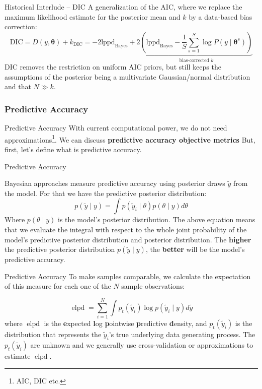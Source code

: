 \begin{frame}{Historical Interlude -- DIC \parencite{spiegelhalter2002bayesian}}
	A generalization of the AIC,
	where we replace the maximum likelihood estimate for the posterior mean
	and $k$ by a data-based bias correction:
	$$
		\text{DIC} = D(y, \boldsymbol{\theta}) + k_{\text{DIC}} = -2 \text{lppd}_{\text{Bayes}}
		+2 \underbrace{\left( \text{lppd}_{\text{Bayes}} - \frac{1}{S} \sum^S_{s=1} \log P(y \mid \boldsymbol{\theta}^s) \right)}_{\text{bias-corrected $k$}}
	$$
	DIC removes the restriction on uniform AIC priors, but still
	keeps the assumptions of the posterior being a multivariate Gaussian/normal distribution
	and that $N \gg k$.
\end{frame}

\subsubsection{Predictive Accuracy}
\begin{frame}{Predictive Accuracy}
	With current computational power, we do not need approximations\footnote{AIC, DIC etc.}.
	\vfill
	We can discuss \textbf{predictive accuracy objective metrics}
	\vfill
	But, first, let's define what is predictive accuracy.
\end{frame}

\begin{frame}{Predictive Accuracy}
	\begin{defn}
		Bayesian approaches measure predictive accuracy using posterior draws
		$\tilde{y}$ from the model.
		For that we have the predictive posterior distribution:
		$$
			p(\tilde{y} \mid y) = \int p(\tilde{y}_i \mid \theta) p(\theta \mid y) d \theta
		$$
		\small
		Where $p(\theta \mid y)$ is the model's posterior distribution.
		The above equation means that we evaluate the integral
		with respect to the whole joint probability of the model's
		predictive posterior distribution and posterior distribution.
		\vfill
		\normalsize
		The \textbf{higher} the predictive posterior distribution
		$p(\tilde{y} \mid y)$,
		the \textbf{better} will be the model's predictive accuracy.
	\end{defn}
\end{frame}

\begin{frame}{Predictive Accuracy}
	To make samples comparable,
	we calculate the expectation of this measure for each one of the $N$ sample observations:

	$$
		\operatorname{elpd} = \sum_{i=1}^N \int p_t(\tilde{y}_i) \log p(\tilde{y}_i \mid y) d \tilde{y}
	$$
	where $\operatorname{elpd}$ is the \textbf{e}xpected \textbf{l}og \textbf{p}ointwise \textbf{p}redictive \textbf{d}ensity,
	and $p_t(\tilde{y}_i)$ is the distribution that represents the
	$\tilde{y}_i$'s true underlying data generating process.
	The $p_t(\tilde{y}_i)$ are unknown and we generally use
	cross-validation or approximations to estimate $\operatorname{elpd}$.
\end{frame}

